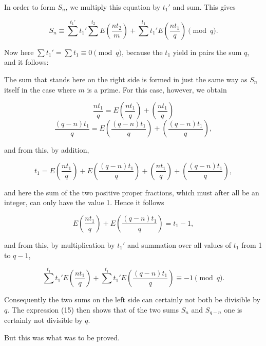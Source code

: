 

In order to form $S_n$, we multiply this equation by $t_1'$ and sum.
This gives

\[
S_n \equiv \sum^{t_1'} t_1' \sum^{t_2} E\left(\frac{n t_2}{m}\right)
+ \sum^{t_1} t_1' E\left(\frac{n t_1}{q}\right) \pmod q.
\]

Now here $\sum t_1' = \sum t_1 \equiv 0 \pmod q$, because the $t_1$
yield in pairs the sum $q$, and it follows:


The sum that stands here on the right side is formed in just the same
way as $S_n$ itself in the case where $m$ is a prime. For this case,
however, we obtain

\[
\frac{n t_1}{q} = E\left(\frac{n t_1}{q}\right) + \left(\frac{n t_1}{q}\right)
\]
\[
\frac{(q-n) t_1}{q} = E\left(\frac{(q-n) t_1}{q}\right) + \left(\frac{(q-n) t_1}{q}\right),
\]

and from this, by addition,

\[
t_1 = E\left(\frac{n t_1}{q}\right) + E\left(\frac{(q-n) t_1}{q}\right)
+ \left(\frac{n t_1}{q}\right) + \left(\frac{(q-n) t_1}{q}\right),
\]

and here the sum of the two positive proper fractions, which must after
all be an integer, can only have the value 1. Hence it follows

\[
E\left(\frac{n t_1}{q}\right) + E\left(\frac{(q-n) t_1}{q}\right) = t_1 - 1,
\]

and from this, by multiplication by $t_1'$ and summation over all
values of $t_1$ from 1 to $q - 1$,

\[
\sum^{t_1} t_1' E\left(\frac{n t_1}{q}\right)
+ \sum^{t_1} t_1' E\left(\frac{(q-n) t_1}{q}\right) \equiv -1 \pmod q.
\]

Consequently the two sums on the left side can certainly not both be
divisible by $q$. The expression (15) then shows that of the two sums
$S_n$ and $S_{q-n}$ one is certainly not divisible by $q$.

But this was what was to be proved.
